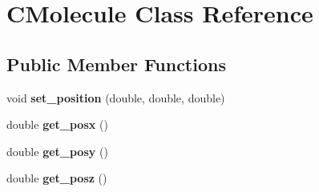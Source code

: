 \hypertarget{classCMolecule}{}\section{C\+Molecule Class Reference}
\label{classCMolecule}
\subsection*{Public Member Functions}
\begin{DoxyCompactItemize}
\item 
\mbox{\label{classCMolecule_ad9a66ae676bd9ed1012f0c6e952369e0}} 
void {\bfseries set\+\_\+position} (double, double, double)
\item 
\mbox{\label{classCMolecule_ac76dbb1e5abbc9fbadcd568d0f2e7d16}} 
double {\bfseries get\+\_\+posx} ()
\item 
\mbox{\label{classCMolecule_a8cf1a6b995c8cbf4f1881f6f38ebca02}} 
double {\bfseries get\+\_\+posy} ()
\item 
\mbox{\label{classCMolecule_a69483e3d6820a96f004ba6c78f8d166e}} 
double {\bfseries get\+\_\+posz} ()
\end{DoxyCompactItemize}
